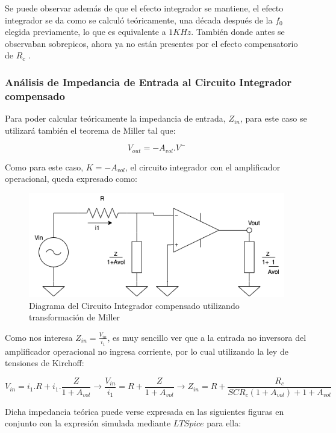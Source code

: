 Se puede observar además de que el efecto integrador se mantiene, el efecto integrador se da como se calculó teóricamente,
una década después de la $f_0$ elegida previamente, lo que es equivalente a $1KHz$. 
También donde antes se observaban sobrepicos, ahora ya no están presentes por el efecto compensatorio de $R_c$ .

\subsubsection{Análisis de Impedancia de Entrada al Circuito Integrador compensado}

Para poder calcular teóricamente la impedancia de entrada, $Z_{in}$, para este caso se utilizará también el teorema de Miller tal que:

$$ V_{out}=-A_{vol}.V^-$$

Como para este caso, $K=-A_{vol}$, el circuito integrador con el amplificador operacional, queda expresado como:

\begin{figure}[H]
    \centering 
    \includegraphics [scale=0.6] {../Ejercicio3-CircuitoIntegradoresyDerivadores/Imagenes/miller-integrador-compensado.png} 
    \caption{Diagrama del Circuito Integrador compensado utilizando transformación de Miller }
    \label{fig:emptyPlotTool}
\end{figure}

Como nos interesa $Z_{in}=\frac{V_{in}}{i_1}$, es muy sencillo ver que a la entrada no inversora del amplificador operacional no ingresa corriente,
por lo cual utilizando la ley de tensiones de Kirchoff:

$$ V_{in} = i_1.R + i_1.\frac{Z}{1+A_{vol}} \longrightarrow \frac{V_{in}}{i_1}= R + \frac{Z}{1+A_{vol}} \longrightarrow Z_{in}=R+\frac{R_c}{SCR_c(1+A_{vol})+1+A_{vol}}$$

Dicha impedancia teórica puede verse expresada en las siguientes figuras en conjunto con la expresión simulada mediante $LTSpice$ para ella:

